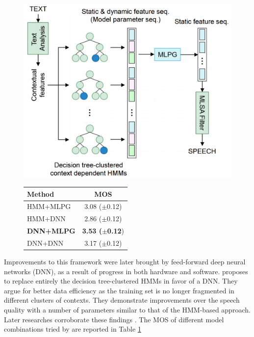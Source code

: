 \documentclass[a4paper, oneside, 12pt, english]{article}
\begin{document}
\begin{figure}[h]
	\centering
	\begin{minipage}{.45\linewidth}
		\centering
		\includegraphics[width=\linewidth]{images/hmm_spss.png}
		\label{hmm_spss_framework}
	\end{minipage}
	\hspace{.05\linewidth}
	\begin{minipage}{.45\linewidth}
		\centering
		\begin{tabular}{| l | c |}
			\hline
			Method & MOS \\
			\hline
			HMM+MLPG & 3.08 ($\pm$0.12) \\
			HMM+DNN & 2.86 ($\pm$0.12) \\
			\textbf{DNN+MLPG} & \textbf{3.53 ($\pm$0.12}) \\
			DNN+DNN & 3.17 ($\pm$0.12) \\
			\hline
		\end{tabular}
		\label{hashimoto_results}
	\end{minipage}
\end{figure}

Improvements to this framework were later brought by feed-forward deep neural networks (DNN), as a result of progress in both hardware and software. \cite{SPSSDNN} proposes to replace entirely the decision tree-clustered HMMs in favor of a DNN. They argue for better data efficiency as the training set is no longer fragmented in different clusters of contexts. They demonstrate improvements over the speech quality with a number of parameters similar to that of the HMM-based approach. Later researches corroborate these findings \citep{OnTheTrainingAspects, Hashimoto-2015}. The MOS of different model combinations tried by \citep{Hashimoto-2015} are reported in Table \ref{hashimoto_results}
\end{document}
